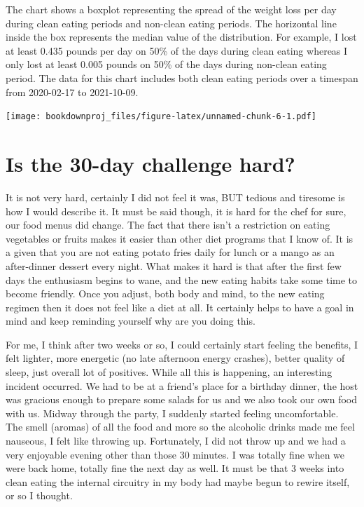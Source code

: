 \documentclass[
  oneside]{book}
\begin{document}
The chart shows a boxplot representing the spread of the weight loss per day during clean eating periods and non-clean eating periods. The horizontal line inside the box represents the median value of the distribution. For example, I lost at least 0.435 pounds per day on 50\% of the days during clean eating whereas I only lost at least 0.005 pounds on 50\% of the days during non-clean eating period. The data for this chart includes both clean eating periods over a timespan from 2020-02-17 to 2021-10-09.

\texttt{[image: bookdownproj\_files/figure-latex/unnamed-chunk-6-1.pdf]}

\hypertarget{is-the-30-day-challenge-hard}{%
\section{Is the 30-day challenge hard?}\label{is-the-30-day-challenge-hard}}

It is not very hard, certainly I did not feel it was, BUT tedious and tiresome is how I would describe it. It must be said though, it is hard for the chef for sure, our food menus did change. The fact that there isn't a restriction on eating vegetables or fruits makes it easier than other diet programs that I know of. It is a given that you are not eating potato fries daily for lunch or a mango as an after-dinner dessert every night. What makes it hard is that after the first few days the enthusiasm begins to wane, and the new eating habits take some time to become friendly. Once you adjust, both body and mind, to the new eating regimen then it does not feel like a diet at all. It certainly helps to have a goal in mind and keep reminding yourself why are you doing this.

For me, I think after two weeks or so, I could certainly start feeling the benefits, I felt lighter, more energetic (no late afternoon energy crashes), better quality of sleep, just overall lot of positives. While all this is happening, an interesting incident occurred. We had to be at a friend's place for a birthday dinner, the host was gracious enough to prepare some salads for us and we also took our own food with us. Midway through the party, I suddenly started feeling uncomfortable. The smell (aromas) of all the food and more so the alcoholic drinks made me feel nauseous, I felt like throwing up. Fortunately, I did not throw up and we had a very enjoyable evening other than those 30 minutes. I was totally fine when we were back home, totally fine the next day as well. It must be that 3 weeks into clean eating the internal circuitry in my body had maybe begun to rewire itself, or so I thought.
\end{document}
